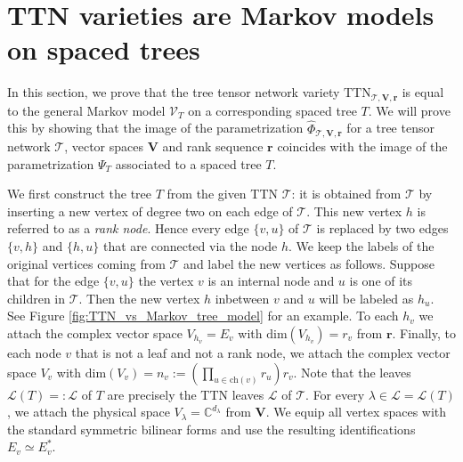 \documentclass[12pt]{article}
\theoremstyle{definition}
\numberwithin{theorem}{section}
\newcommand{\V}{\mathcal{V}}
\begin{document}
\section{TTN varieties are Markov models on spaced trees}\label{sec:TTN_are_spaced_trees}
In this section, we prove that the 
tree tensor network variety $\mathrm{TTN}_{\mathscr{T}, \mathbf{V}, \mathbf{r}}$ is equal to the general Markov model $\V_T$ on a corresponding spaced tree $T$. We will prove this by showing that the image of the parametrization $\widehat{\Phi}_{\mathscr T,\mathbf V,\mathbf r}$ for a tree tensor network $\mathscr{T}$, vector spaces $\boldsymbol{V}$ and rank sequence $\boldsymbol{r}$ coincides with the image of the parametrization $\Psi_T$ associated to a spaced tree $T$. 

We first construct the tree $T$ from the given TTN $\mathscr{T}$: it is obtained from $\mathscr{T}$ by inserting a new vertex of degree two on each edge of $\mathscr{T}$. This new vertex $h$ is referred to as a \emph{rank node}. Hence every edge $\{v,u\}$ of $\mathscr{T}$ is replaced by two edges  $\{v,h\}$ and $\{h,u\}$ that are connected via the node $h$. We keep the labels of the original vertices coming from $\mathscr{T}$ and label the new vertices as follows. Suppose that for the edge $\{v, u\}$ the vertex $v$ is an internal node and $u$ is one of its children in $\mathscr{T}$. Then the new vertex $h$ inbetween $v$ and $u$ will be labeled as $h_u$. See Figure \ref{fig:TTN_vs_Markov_tree_model} for an example. To each $h_v$ we attach the complex vector space $V_{h_v} = E_v$ with $\mathrm{dim}(V_{h_v}) = r_v$ from $\boldsymbol{r}$. Finally, to each node $v$ 
that is not a leaf and not a rank node, we attach the complex vector space $V_v$ with $\mathrm{dim}(V_v) = n_v := (\prod_{u \in \mathrm{ch}(v)} r_u)r_v$. Note that the leaves $\mathcal{L}(T) =: \mathcal{L}$ of $T$ are precisely the TTN leaves
$\mathscr L$ of $\mathscr T$. For every
$\lambda\in\mathscr L=\mathcal L(T)$, we attach the physical space $V_\lambda=\mathbb C^{d_\lambda}$ from $\boldsymbol{V}$. We equip all vertex spaces with the standard symmetric bilinear forms and use the resulting identifications $E_v\simeq E_v^*$.
\end{document}
